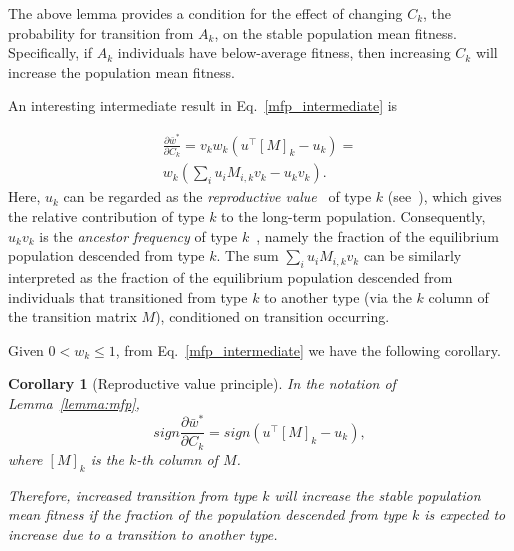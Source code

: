 \documentclass[9pt, a4paper, twocolumn]{extarticle}
\newcommand*{\tr}{^\intercal}
\newtheorem{corollary}{Corollary}
\begin{document}
The above lemma provides a condition for the effect of changing $C_k$, the probability for transition from $A_k$, on the stable population mean fitness.
Specifically, if $A_k$ individuals have below-average fitness, then increasing $C_k$ will increase the population mean fitness.


An interesting intermediate result in Eq.~\ref{mfp_intermediate} is

\begin{equation}
\begin{aligned}
\frac{\partial \bar{w}^*}{\partial C_k} = 
v_k w_k (u\tr[M]_k - u_k) = \\
w_k (\sum_i{u_i M_{i,k} v_k} - u_k v_k).
\end{aligned}
\end{equation}
Here, $u_k$ can be regarded as the \emph{reproductive value}~\citep[pg.~27]{Fisher1930} of type $k$ (see~), which gives the relative contribution of type $k$ to the long-term population.
Consequently, $u_k v_k$ is the \emph{ancestor frequency} of type $k$~\citep{Hermisson2002}, namely the fraction of the equilibrium population descended from type $k$.
The sum $\sum_i{u_i M_{i,k} v_k}$ can be similarly interpreted as the fraction of the equilibrium population descended from individuals that transitioned from type $k$ to another type (via the $k$ column of the transition matrix $M$), conditioned on transition occurring.

Given $0 < w_k \le 1$, from Eq.~\ref{mfp_intermediate} we have the following corollary.

\begin{corollary}[Reproductive value principle]
In the notation of Lemma~\ref{lemma:mfp},
\begin{equation}
sign \frac{\partial \bar{w}^*}{\partial C_k} = 
sign (u\tr [M]_k - u_k),
\end{equation}
where $[M]_k$ is the $k$-th column of $M$.

Therefore, increased transition from type $k$ will increase the stable population mean fitness if the fraction of the population descended from type $k$ is expected to increase due to a transition to another type. 
\end{corollary}

\end{document}
